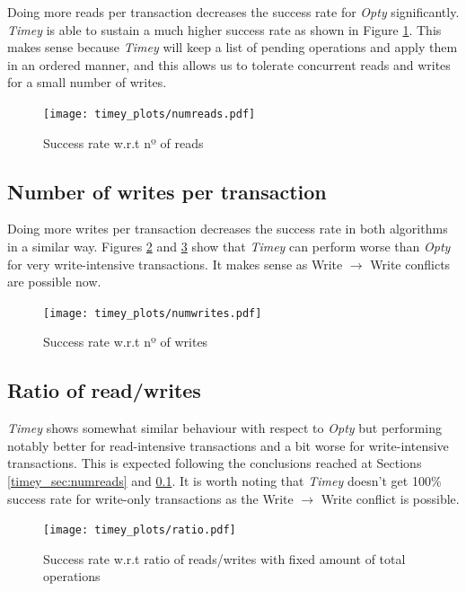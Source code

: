 \documentclass[a4paper, 10pt]{article}
\begin{document}
Doing more reads per transaction decreases the success rate for \textit{Opty} significantly. \textit{Timey} is able to sustain a much higher success rate as shown in Figure \ref{timey:numreads}. This makes sense because \textit{Timey} will keep a list of pending operations and apply them in an ordered manner, and this allows us to tolerate concurrent reads and writes for a small number of writes.

\begin{figure}[H]
  \centering
  \texttt{[image: timey\_plots/numreads.pdf]}
    \caption{Success rate w.r.t nº of reads}
    \label{timey:numreads}
\end{figure} 

\clearpage
\subsection{Number of writes per transaction}
\label{timey_sec:numwrites}

Doing more writes per transaction decreases the success rate in both algorithms in a similar way. Figures \ref{timey:numwrites} and \ref{timey:ratio} show that \textit{Timey} can perform worse than \textit{Opty} for very write-intensive transactions. It makes sense as Write $\rightarrow$ Write conflicts are possible now.

\begin{figure}[H]
  \centering
  \texttt{[image: timey\_plots/numwrites.pdf]}
    \caption{Success rate w.r.t nº of writes}
    \label{timey:numwrites}
\end{figure} 

\clearpage
\subsection{Ratio of read/writes}

\textit{Timey} shows somewhat similar behaviour with respect to \textit{Opty} but performing notably better for read-intensive transactions and a bit worse for write-intensive transactions. This is expected following the conclusions reached at Sections \ref{timey_sec:numreads} and \ref{timey_sec:numwrites}. It is worth noting that \textit{Timey} doesn't get 100\% success rate for write-only transactions as the Write $\rightarrow$ Write conflict is possible.


\begin{figure}[H]
  \centering
  \texttt{[image: timey\_plots/ratio.pdf]}
    \caption{Success rate w.r.t ratio of reads/writes with fixed amount of total operations}
    \label{timey:ratio}
\end{figure} 
\end{document}

